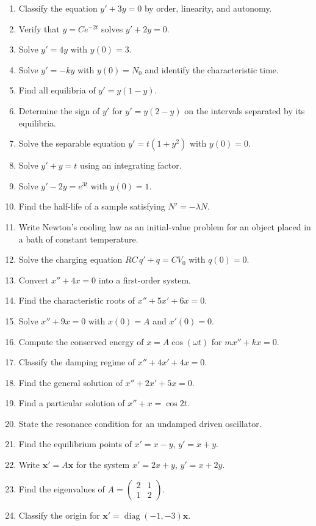 \begin{enumerate}[label=\textbf{\arabic*.},leftmargin=*]
\item Classify the equation $y'+3y=0$ by order, linearity, and autonomy.
\item Verify that $y=Ce^{-2t}$ solves $y'+2y=0$.
\item Solve $y'=4y$ with $y(0)=3$.
\item Solve $y'=-ky$ with $y(0)=N_0$ and identify the characteristic time.
\item Find all equilibria of $y'=y(1-y)$.
\item Determine the sign of $y'$ for $y'=y(2-y)$ on the intervals separated by its equilibria.
\item Solve the separable equation $y'=t(1+y^2)$ with $y(0)=0$.
\item Solve $y'+y=t$ using an integrating factor.
\item Solve $y'-2y=e^{3t}$ with $y(0)=1$.
\item Find the half-life of a sample satisfying $N'=-\lambda N$.
\item Write Newton's cooling law as an initial-value problem for an object placed in a bath of constant temperature.
\item Solve the charging equation $RC\,q'+q=CV_0$ with $q(0)=0$.
\item Convert $x''+4x=0$ into a first-order system.
\item Find the characteristic roots of $x''+5x'+6x=0$.
\item Solve $x''+9x=0$ with $x(0)=A$ and $x'(0)=0$.
\item Compute the conserved energy of $x=A\cos(\omega t)$ for $m x''+kx=0$.
\item Classify the damping regime of $x''+4x'+4x=0$.
\item Find the general solution of $x''+2x'+5x=0$.
\item Find a particular solution of $x''+x=\cos 2t$.
\item State the resonance condition for an undamped driven oscillator.
\item Find the equilibrium points of $x'=x-y$, $y'=x+y$.
\item Write $\mathbf x'=A\mathbf x$ for the system $x'=2x+y$, $y'=x+2y$.
\item Find the eigenvalues of $A=\begin{pmatrix}2&1\\1&2\end{pmatrix}$.
\item Classify the origin for $\mathbf x'=\operatorname{diag}(-1,-3)\mathbf x$.

\end{enumerate}
